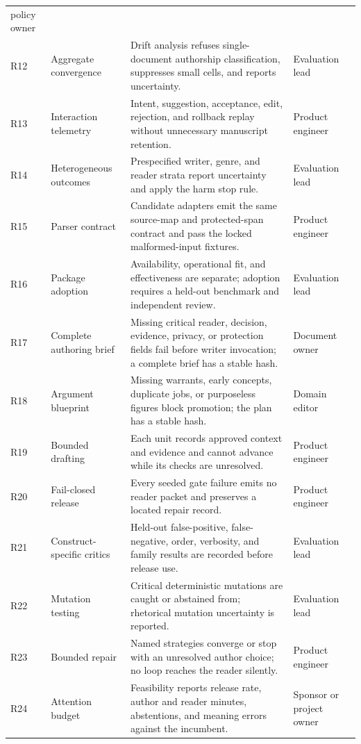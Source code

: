 \begin{longtable}{@{}p{}p{}p{}p{}@{}}
policy owner \\
R12 & Aggregate convergence & Drift analysis refuses single-document
authorship classification, suppresses small cells, and reports uncertainty. &
Evaluation lead \\
R13 & Interaction telemetry & Intent, suggestion, acceptance, edit, rejection,
and rollback replay without unnecessary manuscript retention. & Product engineer \\
R14 & Heterogeneous outcomes & Prespecified writer, genre, and reader strata
report uncertainty and apply the harm stop rule. & Evaluation lead \\
R15 & Parser contract & Candidate adapters emit the same source-map and
protected-span contract and pass the locked malformed-input fixtures. & Product
engineer \\
R16 & Package adoption & Availability, operational fit, and effectiveness are
separate; adoption requires a held-out benchmark and independent review. &
Evaluation lead \\
R17 & Complete authoring brief & Missing critical reader, decision, evidence,
privacy, or protection fields fail before writer invocation; a complete brief
has a stable hash. & Document owner \\
R18 & Argument blueprint & Missing warrants, early concepts, duplicate jobs, or
purposeless figures block promotion; the plan has a stable hash. & Domain editor \\
R19 & Bounded drafting & Each unit records approved context and evidence and
cannot advance while its checks are unresolved. & Product engineer \\
R20 & Fail-closed release & Every seeded gate failure emits no reader packet and
preserves a located repair record. & Product engineer \\
R21 & Construct-specific critics & Held-out false-positive, false-negative,
order, verbosity, and family results are recorded before release use. &
Evaluation lead \\
R22 & Mutation testing & Critical deterministic mutations are caught or
abstained from; rhetorical mutation uncertainty is reported. & Evaluation lead \\
R23 & Bounded repair & Named strategies converge or stop with an unresolved
author choice; no loop reaches the reader silently. & Product engineer \\
R24 & Attention budget & Feasibility reports release rate, author and reader
minutes, abstentions, and meaning errors against the incumbent. & Sponsor or
project owner \\
\bottomrule
\end{longtable}

